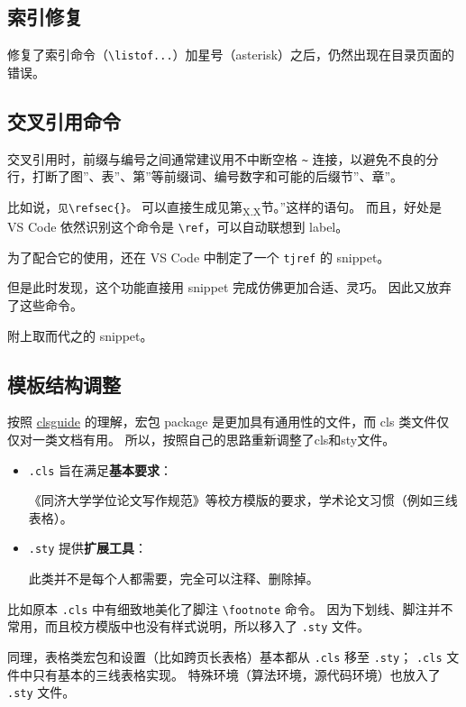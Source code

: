 \documentclass[../Main/thesis.tex]{subfiles}
\begin{document}
\subsection{索引修复}

修复了索引命令（\texttt{\textbackslash{}listof...}）加星号（asterisk）之后，仍然出现在目录页面的错误。

\subsection{交叉引用命令}

交叉引用时，前缀与编号之间通常建议用不中断空格
\texttt{\textasciitilde{}}
连接，以避免不良的分行，打断了图''、表''、第''等前缀词、编号数字和可能的后缀节''、章''。

比如说，\texttt{见\textbackslash{}refsec\{\}。}
可以直接生成见第\textsubscript{X.X}节。''这样的语句。 而且，好处是 VS Code 依然识别这个命令是 \texttt{\textbackslash{}ref}，可以自动联想到 label。

为了配合它的使用，还在 VS Code 中制定了一个 \texttt{tjref} 的 snippet。

但是此时发现，这个功能直接用 snippet 完成仿佛更加合适、灵巧。
因此又放弃了这些命令。

附上取而代之的 snippet。

\subsection{模板结构调整}

按照 \href{http://texdoc.net/texmf-dist/doc/latex/base/clsguide.pdf}{clsguide}
的理解，宏包 package 是更加具有通用性的文件，而 cls
类文件仅仅对一类文档有用。 所以，按照自己的思路重新调整了cls和sty文件。

\begin{itemize}
\item
  \texttt{.cls} 旨在满足\textbf{基本要求}：

  《同济大学学位论文写作规范》等校方模版的要求，学术论文习惯（例如三线表格）。
\item
  \texttt{.sty} 提供\textbf{扩展工具}：

  此类并不是每个人都需要，完全可以注释、删除掉。
\end{itemize}

比如原本 \texttt{.cls} 中有细致地美化了脚注
\texttt{\textbackslash{}footnote} 命令。
因为下划线、脚注并不常用，而且校方模版中也没有样式说明，所以移入了
\texttt{.sty} 文件。

同理，表格类宏包和设置（比如跨页长表格）基本都从 \texttt{.cls} 移至
\texttt{.sty}； \texttt{.cls} 文件中只有基本的三线表格实现。
特殊环境（算法环境，源代码环境）也放入了 \texttt{.sty} 文件。
\end{document}
